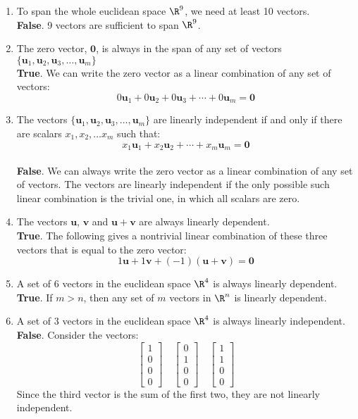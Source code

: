 \documentclass[12pt]{article}
\begin{document}
\begin{enumerate}
\item To span the whole euclidean space $\R^9$, we need at least 10 vectors.\\
\textbf{False}. 9 vectors are sufficient to span $\R^9$.

\item The zero vector, $\mathbf{0}$, is always in the span of any set of vectors $\{\mathbf{u}_1, \mathbf{u}_2, \mathbf{u}_3,\ldots ,\mathbf{u}_m\}$\\
\textbf{True}. We can write the zero vector as a linear combination of any set of vectors:
\[
0\mathbf{u}_1+0\mathbf{u}_2+0\mathbf{u}_3+\cdots+0\mathbf{u}_m=\mathbf{0}
\]

\item The vectors $\{\mathbf{u}_1, \mathbf{u}_2, \mathbf{u}_3,\ldots ,\mathbf{u}_m\}$ are linearly independent if and only if there are scalars $x_1, x_2,\ldots x_m$ such that:
\[
x_1\mathbf{u}_1+x_2\mathbf{u}_2+\cdots+x_m\mathbf{u}_m=\mathbf{0}
\]\\
\textbf{False}. We can always write the zero vector as a linear combination of any set of vectors. The vectors are linearly independent if the only possible such linear combination is the trivial one, in which all scalars are zero.

\item The vectors $\mathbf{u}$, $\mathbf{v}$ and $\mathbf{u}+\mathbf{v}$ are always linearly dependent.\\
\textbf{True}. The following gives a nontrivial linear combination of these three vectors that is equal to the zero vector:
\[
1\mathbf{u}+1\mathbf{v}+(-1)(\mathbf{u}+\mathbf{v})=\mathbf{0}
\]

\item A set of $6$ vectors in the euclidean space $\R^4$ is always linearly dependent.\\
\textbf{True}. If $m>n$, then any set of $m$ vectors in $\R^n$ is linearly dependent.

\item A set of $3$ vectors in the euclidean space $\R^4$ is always linearly independent.\\
\textbf{False}. Consider the vectors:
\[
\left[\begin{matrix} 1 \\ 0 \\ 0 \\ 0 \end{matrix}\right]\quad
\left[\begin{matrix} 0 \\ 1 \\ 0 \\ 0 \end{matrix}\right]\quad
\left[\begin{matrix} 1 \\ 1 \\ 0 \\ 0 \end{matrix}\right]
\]
Since the third vector is the sum of the first two, they are not linearly independent.


\end{enumerate}
\end{document}
